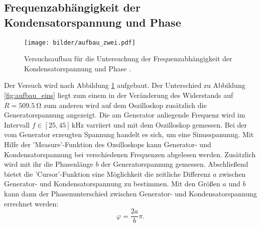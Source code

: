 \subsection{Frequenzabhängigkeit der Kondensatorspannung und Phase}
\begin{figure}
  \centering
  \texttt{[image: bilder/aufbau\_zwei.pdf]}
  \caption{Versuchsaufbau für die Untersuchung der Frequenzabhängigkeit der Kondensatorspannung und Phase \cite{anleitung354}. }
  \label{fig:aufbau_zwei}
\end{figure}
Der Versuch wird nach Abbildung \ref{fig:aufbau_zwei} aufgebaut.
Der Unterschied zu Abbildung \ref{fig:aufbau_eins} liegt zum einem
in der Veränderung des Widerstands auf $R=\SI{509.5}{\ohm}$ zum anderen wird
auf dem Oszilloskop zusätzlich die Generatorspannung angezeigt.
Die am Generator anliegende Frequenz wird im Intervall $f\in\left[25,45\right]\,\si{\kilo\hertz}$
varriiert und mit dem Oszilloskop gemessen. Bei der vom Generator erzeugten Spannung handelt es sich, um
eine Sinusspanunng. Mit Hilfe der 'Measure'-Funktion des Ozsilloskops %
kann Generator- und Kondensatorspannung bei verschiedenen Frequenzen %
abgelesen werden. Zusätzlich wird mit ihr die Phasenlänge $b$ der Generatorspannung
gemessen. Abschließend bietet die 'Cursor'-Funktion eine Möglichkeit %
die zeitliche Differenz $a$ zwischen Generator- und Kondensatorspannung zu
bestimmen.
Mit den Größen $a$ und $b$ kann dann der Phasenunterschied zwischen
Generator- und Kondensatorspannung errechnet werden:
\begin{equation}
  \label{eq:phasen_unterschied}
  \varphi=\frac{2a}{b}\pi.
\end{equation}
